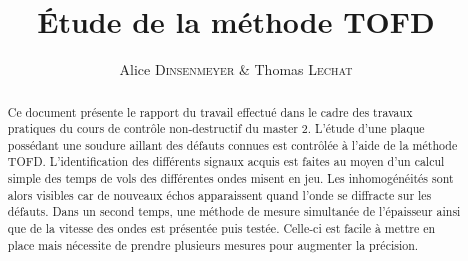 \documentclass[twoside]{article}
\title{\vspace{-15mm}\fontsize{24pt}{10pt}\selectfont\textbf{Étude de la méthode TOFD}} %
\author{
\large
{Alice \textsc{Dinsenmeyer} \& Thomas \textsc{Lechat}}\\[2mm] %
\vspace{-5mm}
}
\date{}
\begin{document}
\maketitle %

\thispagestyle{fancy} %


\begin{abstract}

\noindent

Ce document présente le rapport du travail effectué dans le cadre des travaux pratiques du cours de contrôle non-destructif du master 2. L'étude d'une plaque possédant une soudure aillant des défauts connues est contrôlée à l'aide de la méthode TOFD. L'identification des différents signaux acquis est faites au moyen d'un calcul simple des temps de vols des différentes ondes misent en jeu. Les inhomogénéités sont alors visibles car de nouveaux échos apparaissent quand l'onde se diffracte sur les défauts. Dans un second temps, une méthode de mesure simultanée de l'épaisseur ainsi que de la vitesse des ondes est présentée puis testée. Celle-ci est facile à mettre en place mais nécessite de prendre plusieurs mesures pour augmenter la précision.

\end{abstract}

\end{document}
